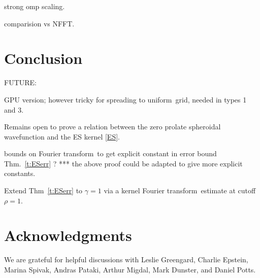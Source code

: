 \documentclass[10pt]{article}
\newcommand{\U}{{uniform}}
\newcommand{\FT}{Fourier transform}
\begin{document}
strong omp scaling.

comparision vs NFFT.


\section{Conclusion}




FUTURE:

GPU version; however tricky for spreading to \U\ grid, needed in types 1 and 3.

Remains open to prove a relation between the zero prolate spheroidal
wavefunction and the ES kernel \eqref{ES}.

bounds on \FT\ to get
explicit constant in error bound Thm.~\ref{t:ESerr} ?
*** the above proof could be adapted to give more explicit constants.


Extend Thm~\ref{t:ESerr} to $\gamma=1$ via a kernel \FT\ estimate at cutoff
$\rho=1$.


\section*{Acknowledgments}

We are grateful for helpful discussions with Leslie Greengard,
Charlie Epstein, Marina Spivak, Andras Pataki, Arthur Migdal,
Mark Dunster, and Daniel Potts.




\end{document}
